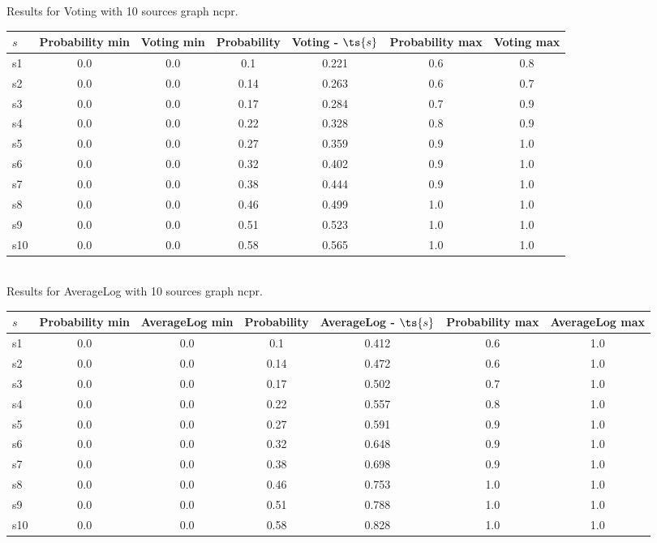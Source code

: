 \documentclass{article}
\begin{document}
\noindent Results for Voting with 10 sources graph ncpr.

\noindent\begin{tabular}{|l|c|c|c|c|c|c|}
\hline
$s$& Probability min & Voting min & Probability & Voting - $\ts{s}$ & Probability max & Voting max\\
\hline
s1 &0.0 & 0.0 & 0.1 & 0.221 & 0.6 & 0.8\\
\hline
s2 &0.0 & 0.0 & 0.14 & 0.263 & 0.6 & 0.7\\
\hline
s3 &0.0 & 0.0 & 0.17 & 0.284 & 0.7 & 0.9\\
\hline
s4 &0.0 & 0.0 & 0.22 & 0.328 & 0.8 & 0.9\\
\hline
s5 &0.0 & 0.0 & 0.27 & 0.359 & 0.9 & 1.0\\
\hline
s6 &0.0 & 0.0 & 0.32 & 0.402 & 0.9 & 1.0\\
\hline
s7 &0.0 & 0.0 & 0.38 & 0.444 & 0.9 & 1.0\\
\hline
s8 &0.0 & 0.0 & 0.46 & 0.499 & 1.0 & 1.0\\
\hline
s9 &0.0 & 0.0 & 0.51 & 0.523 & 1.0 & 1.0\\
\hline
s10 &0.0 & 0.0 & 0.58 & 0.565 & 1.0 & 1.0\\
\hline
\end{tabular}\\

\noindent Results for AverageLog with 10 sources graph ncpr.

\noindent\begin{tabular}{|l|c|c|c|c|c|c|}
\hline
$s$& Probability min & AverageLog min & Probability & AverageLog - $\ts{s}$ & Probability max & AverageLog max\\
\hline
s1 &0.0 & 0.0 & 0.1 & 0.412 & 0.6 & 1.0\\
\hline
s2 &0.0 & 0.0 & 0.14 & 0.472 & 0.6 & 1.0\\
\hline
s3 &0.0 & 0.0 & 0.17 & 0.502 & 0.7 & 1.0\\
\hline
s4 &0.0 & 0.0 & 0.22 & 0.557 & 0.8 & 1.0\\
\hline
s5 &0.0 & 0.0 & 0.27 & 0.591 & 0.9 & 1.0\\
\hline
s6 &0.0 & 0.0 & 0.32 & 0.648 & 0.9 & 1.0\\
\hline
s7 &0.0 & 0.0 & 0.38 & 0.698 & 0.9 & 1.0\\
\hline
s8 &0.0 & 0.0 & 0.46 & 0.753 & 1.0 & 1.0\\
\hline
s9 &0.0 & 0.0 & 0.51 & 0.788 & 1.0 & 1.0\\
\hline
s10 &0.0 & 0.0 & 0.58 & 0.828 & 1.0 & 1.0\\
\hline
\end{tabular}\\
\end{document}
